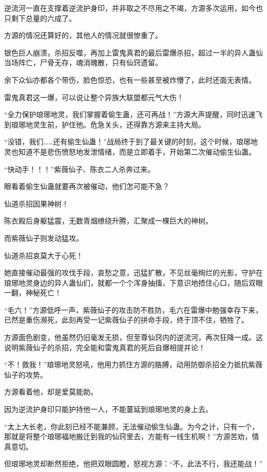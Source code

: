 \begin{this_body}
逆流河一直在支撑着逆流护身印，并非取之不尽用之不竭，方源多次运用，如今也只剩下总量的六成了。

方源的情况还算好的，其他人的情况就很惨重了。

银色巨人崩溃，杀招反噬，再加上雷鬼真君的最后雷爆杀招，超过一半的异人蛊仙当场阵亡，尸骨无存，魂消魄散，只有仙窍遗留。

余下众仙亦都各个带伤，脸色惊恐，也有一些甚至被炸懵了，此时还面无表情。

雷鬼真君这一爆，可以说让整个异族大联盟都元气大伤！

“全力保护琅琊地灵，我们掌握着偷生蛊，还可再战！”方源大声提醒，同时迅速飞到琅琊地灵生前，护住他。危急关头，还得靠方源来主持大局。

“没错，我们……还有偷生仙蛊！”战局终于到了最关键的时刻，这个时候，琅琊地灵也知道不是悲伤愤怒地发泄情绪，而是立即着手，开始第二次催动偷生仙蛊。

“快动手！！！”紫薇仙子、陈衣二人杀奔过来。

眼看着偷生仙蛊就要再次被催动，他们怎可能不急？

仙道杀招因果神树！

陈衣殿后身躯猛震，无数青烟缭绕升腾，汇聚成一棵巨大的神树。

而紫薇仙子则发动猛攻。

仙道杀招哀莫大于心死！

她直接催动最强的攻伐手段，哀愁之意，迅猛扩散，不见丝毫绚烂的光影，守护在琅琊地灵身边的异人蛊仙们，就都一个个浑身抽搐，下意识地捂住心口，随后双眼一翻，神秘死亡！

“毛六！”方源低呼一声，紫薇仙子的攻击防不胜防，毛六在雷爆中勉强幸存下来，已然是重伤濒死，此刻再受一记紫薇仙子的拼命手段，终于顶不住，牺牲了。

方源面色剧变，他虽然仍旧毫发无损，但至尊仙窍内的逆流河，再次狂降一成。这说明紫薇仙子的杀招，完全能和雷鬼真君的死后自爆相提并论！

“不！救我！”琅琊地灵怒吼，他用力抓住方源的胳膊，动用防御杀招全力抵抗紫薇仙子的攻势。

方源看着他，却是爱莫能助。

因为逆流护身印只能护持他一人，不能蔓延到琅琊地灵的身上去。

“太上大长老，你此刻已经不能兼顾，无法催动偷生仙蛊。为今之计，只有一个，那就是将整个琅琊福地搬迁到我的仙窍里去，方能有一线生机啊！”方源苦劝，情真意切。

但琅琊地灵却断然拒绝，他把双眼圆瞪，怒视方源：“不，此法不行，我还能战！”


\end{this_body}
